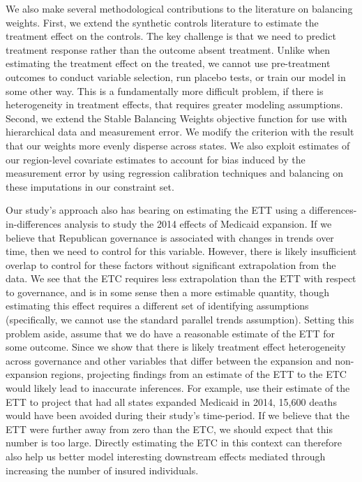 \documentclass[12pt]{article}
\begin{document}
We also make several methodological contributions to the literature on balancing weights. First, we extend the synthetic controls literature to estimate the treatment effect on the controls. The key challenge is that we need to predict treatment response rather than the outcome absent treatment. Unlike when estimating the treatment effect on the treated, we cannot use pre-treatment outcomes to conduct variable selection, run placebo tests, or train our model in some other way. This is a fundamentally more difficult problem, if there is heterogeneity in treatment effects, that requires greater modeling assumptions. Second, we extend the Stable Balancing Weights objective function for use with hierarchical data and measurement error. We modify the criterion with the result that our weights more evenly disperse across states. We also exploit estimates of our region-level covariate estimates to account for bias induced by the measurement error by using regression calibration techniques and balancing on these imputations in our constraint set.

Our study's approach also has bearing on estimating the ETT using a differences-in-differences analysis to study the 2014 effects of Medicaid expansion. If we believe that Republican governance is associated with changes in trends over time, then we need to control for this variable. However, there is likely insufficient overlap to control for these factors without significant extrapolation from the data. We see that the ETC requires less extrapolation than the ETT with respect to governance, and is in some sense then a more estimable quantity, though estimating this effect requires a different set of identifying assumptions (specifically, we cannot use the standard parallel trends assumption). Setting this problem aside, assume that we do have a reasonable estimate of the ETT for some outcome. Since we show that there is likely treatment effect heterogeneity across governance and other variables that differ between the expansion and non-expansion regions, projecting findings from an estimate of the ETT to the ETC would likely lead to inaccurate inferences. For example, \cite{miller2019medicaid} use their estimate of the ETT to project that had all states expanded Medicaid in 2014, 15,600 deaths would have been avoided during their study's time-period. If we believe that the ETT were further away from zero than the ETC, we should expect that this number is too large. Directly estimating the ETC in this context can therefore also help us better model interesting downstream effects mediated through increasing the number of insured individuals. 
\end{document}
